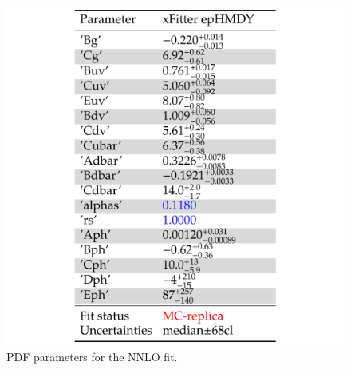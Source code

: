 \begin{figure}
\includegraphics[width=14cm]{parameters.pdf} 
\caption{PDF parameters for the NNLO fit.}
\label{par_scan}
\end{figure}

